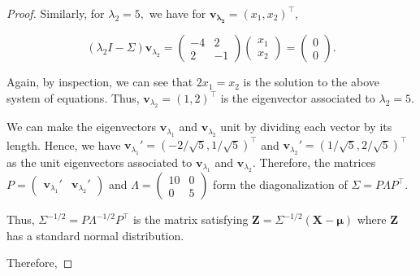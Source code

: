 \documentclass[12pt]{article}
\theoremstyle{definition}
\newcommand{\vect}[1]{\boldsymbol{#1}}
\begin{document}
\begin{proof}
  Similarly, for $\lambda_2 = 5,$ we have for $\vect{v_{\lambda_2}} = (x_1, x_2)^\intercal$,

  \[
    (\lambda_2 I - \Sigma) \vect{v}_{\lambda_2} = \left(\begin{matrix} -4 & 2 \\ 2 & -1\end{matrix} \right)
    \left( \begin{matrix} x_1 \\ x_2 \end{matrix}\right) = \left( \begin{matrix} 0 \\ 0 \end{matrix}\right).
  \]

  Again, by inspection, we can see that $2x_1 = x_2$ is the solution to the above
  system of equations. Thus, $\vect{v}_{\lambda_2} = (1, 2)^\intercal$ is the
  eigenvector associated to $\lambda_2 = 5$.

  We can make the eigenvectors $\vect{v}_{\lambda_1}$ and $\vect{v}_{\lambda_2}$
  unit by dividing each vector by its length. Hence, we have
  $\vect{v}_{\lambda_1}' = (-2/\sqrt{5}, 1/\sqrt{5})^\intercal$ and $\vect{v}_{\lambda_2}'=(1/\sqrt{5}, 2/\sqrt{5})^\intercal$
  as the unit eigenvectors associated to $\vect{v}_{\lambda_1}$ and $\vect{v}_{\lambda_2}.$
  Therefore, the matrices $P = \left( \begin{matrix} \vect{v}_{\lambda_1}' & \vect{v}_{\lambda_2}' \end{matrix} \right)$ and
  $\Lambda = \left( \begin{matrix} 10 & 0 \\ 0 & 5 \end{matrix} \right)$ form the
  diagonalization of $\Sigma = P \Lambda P^\intercal.$

  Thus, $\Sigma^{-1/2} = P \Lambda^{-1/2} P^\intercal$ is the matrix satisfying
  $\vect{Z} = \Sigma^{-1/2}(\vect{X} - \vect{\mu})$ where $\vect{Z}$ has a
  standard normal distribution.

  Therefore,


\end{proof}
\end{document}
